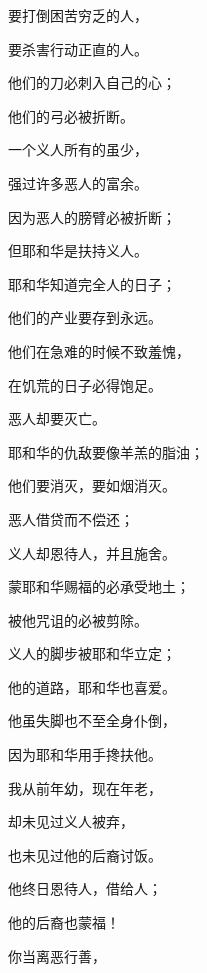 {\par }{\Q 要打倒困苦穷乏的人，
\par }{\Q 要杀害行动正直的人。
\par }{\Q {}他们的刀必刺入自己的心；
\par }{\Q 他们的弓必被折断。
\par }{\BB \par }{\Q {}一个义人所有的虽少，
\par }{\Q 强过许多恶人的富余。
\par }{\Q {}因为恶人的膀臂必被折断；
\par }{\Q 但耶和华是扶持义人。
\par }{\BB \par }{\Q {}耶和华知道完全人的日子；
\par }{\Q 他们的产业要存到永远。
\par }{\Q {}他们在急难的时候不致羞愧，
\par }{\Q 在饥荒的日子必得饱足。
\par }{\BB \par }{\Q {}恶人却要灭亡。
\par }{\Q 耶和华的仇敌要像羊羔的脂油；
\par }{\Q 他们要消灭，要如烟消灭。
\par }{\BB \par }{\Q {}恶人借贷而不偿还；
\par }{\Q 义人却恩待人，并且施舍。
\par }{\Q {}蒙耶和华赐福的必承受地土；
\par }{\Q 被他咒诅的必被剪除。
\par }{\BB \par }{\Q {}义人的脚步被耶和华立定；
\par }{\Q 他的道路，耶和华也喜爱。
\par }{\Q {}他虽失脚也不至全身仆倒，
\par }{\Q 因为耶和华用手搀扶他。
\par }{\BB \par }{\Q {}我从前年幼，现在年老，
\par }{\Q 却未见过义人被弃，
\par }{\Q 也未见过他的后裔讨饭。
\par }{\Q {}他终日恩待人，借给人；
\par }{\Q 他的后裔也蒙福！
\par }{\BB \par }{\Q {}你当离恶行善，
}
